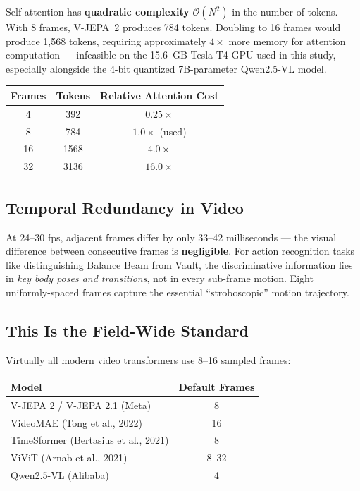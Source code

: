 \documentclass[a4paper, 12pt]{article}
\begin{document}
Self-attention has \textbf{quadratic complexity} $\mathcal{O}(N^2)$ in the number of tokens. With 8 frames, V-JEPA~2 produces 784 tokens. Doubling to 16 frames would produce 1,568 tokens, requiring approximately $4\times$ more memory for attention computation --- infeasible on the 15.6~GB Tesla T4 GPU used in this study, especially alongside the 4-bit quantized 7B-parameter Qwen2.5-VL model.

\begin{center}
\renewcommand{\arraystretch}{1.3}
\begin{tabular}{ccc}
\toprule
\textbf{Frames} & \textbf{Tokens} & \textbf{Relative Attention Cost} \\
\midrule
4  & 392  & $0.25\times$ \\
8  & 784  & $1.0\times$ (used) \\
16 & 1568 & $4.0\times$ \\
32 & 3136 & $16.0\times$ \\
\bottomrule
\end{tabular}
\end{center}

\subsection{Temporal Redundancy in Video}

At 24--30 fps, adjacent frames differ by only 33--42 milliseconds --- the visual difference between consecutive frames is \textbf{negligible}. For action recognition tasks like distinguishing Balance Beam from Vault, the discriminative information lies in \emph{key body poses and transitions}, not in every sub-frame motion. Eight uniformly-spaced frames capture the essential ``stroboscopic'' motion trajectory.

\subsection{This Is the Field-Wide Standard}

Virtually all modern video transformers use 8--16 sampled frames:

\begin{center}
\renewcommand{\arraystretch}{1.3}
\begin{tabular}{lc}
\toprule
\textbf{Model} & \textbf{Default Frames} \\
\midrule
V-JEPA 2 / V-JEPA 2.1 (Meta) & 8 \\
VideoMAE (Tong et al., 2022)  & 16 \\
TimeSformer (Bertasius et al., 2021) & 8 \\
ViViT (Arnab et al., 2021) & 8--32 \\
Qwen2.5-VL (Alibaba) & 4 \\
\bottomrule
\end{tabular}
\end{center}
\end{document}
